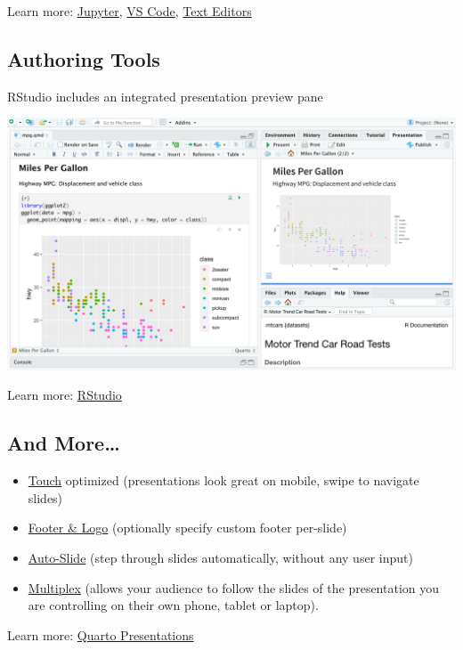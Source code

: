 \documentclass[
  letterpaper,
  DIV=11,
  numbers=noendperiod]{scrartcl}
\providecommand{\tightlist}{%
  \setlength{\itemsep}{0pt}\setlength{\parskip}{0pt}}\usepackage{longtable,booktabs,array}
\begin{document}
Learn more:
\href{https://quarto.org/docs/tools/jupyter-lab.html}{Jupyter},
\href{https://quarto.org/docs/tools/vscode.html}{VS Code},
\href{https://quarto.org/docs/tools/text-editors.html}{Text Editors}

\hypertarget{authoring-tools-1}{%
\subsection{Authoring Tools}\label{authoring-tools-1}}

RStudio includes an integrated presentation preview pane

\includegraphics[width=9.375in,height=\textheight]{images/rstudio.png}

Learn more: \href{https://quarto.org/docs/tools/rstudio.html}{RStudio}

\hypertarget{and-more}{%
\subsection{And More\ldots{}}\label{and-more}}

\begin{itemize}
\tightlist
\item
  \href{https://quarto.org/docs/presentations/revealjs/advanced.html\#touch-navigation}{Touch}
  optimized (presentations look great on mobile, swipe to navigate
  slides)
\item
  \href{https://quarto.org/docs/presentations/revealjs/\#footer-logo}{Footer
  \& Logo} (optionally specify custom footer per-slide)
\item
  \href{https://quarto.org/docs/presentations/revealjs/presenting.html\#auto-slide}{Auto-Slide}
  (step through slides automatically, without any user input)
\item
  \href{https://quarto.org/docs/presentations/revealjs/presenting.html\#multiplex}{Multiplex}
  (allows your audience to follow the slides of the presentation you are
  controlling on their own phone, tablet or laptop).
\end{itemize}

Learn more:
\href{https://quarto.org/docs/presentations/revealjs/}{Quarto
Presentations}
\end{document}
